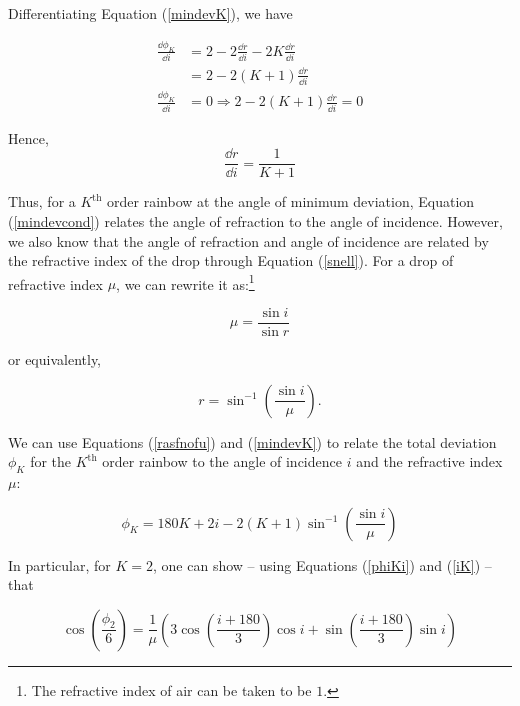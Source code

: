 Differentiating Equation (\ref{mindevK}), we have

\begin{equation*}
\begin{aligned}
\frac{\dd\phi_{K}}{\dd i}&=2-2\frac{\dd r}{\dd i}-2K\frac{\dd r}{\dd i}\\
&=2-2(K+1)\frac{\dd r}{\dd i}\\
\frac{\dd \phi_{K}}{\dd i}&=0\Rightarrow2-2(K+1)\frac{\dd r}{\dd i}=0
\end{aligned}
\end{equation*}

Hence,         
\begin{equation}
    \frac{\dd r}{\dd i}=\frac{1}{K+1}
    \label{mindevcond}
\end{equation}

Thus, for a $K^\text{th}$ order rainbow at the angle of minimum deviation, Equation (\ref{mindevcond}) relates the angle of refraction to the angle of incidence. However, we also know that the angle of refraction and angle of incidence are related by the refractive index of the drop through Equation (\ref{snell}). For a drop of refractive index $\mu$, we can rewrite it as:\footnote{The refractive index of air can be taken to be $1$.}

\begin{equation}
    \mu = \frac{\sin{i}}{\sin{r}}
    \label{snellir}
\end{equation}

 or equivalently,
 
 \begin{equation}
     r = \sin^{-1}\left(\frac{\sin{i}}{\mu}\right).
     \label{rasfnofu}
 \end{equation}

We can use  Equations (\ref{rasfnofu}) and (\ref{mindevK}) to relate the total deviation $\phi_K$ for the $K^\text{th}$ order rainbow to the angle of incidence $i$ and the refractive index $\mu$:
 
 \begin{equation}
     \phi_K = 180K + 2i - 2(K+1)\sin^{-1}\left(\frac{\sin i}{\mu}\right)
     \label{phiKi}
 \end{equation}

In particular, for $K = 2$, one can show -- using Equations (\ref{phiKi}) and (\ref{iK}) -- that 

\begin{equation}
   \cos\left( \frac{\phi_2}{6}\right) = \frac{1}{\mu}\left( 3 \cos\left(\frac{i + 180}{3}\right) \cos{i} + \sin\left(\frac{i + 180}{3}\right)\sin{i} \right)
\end{equation}


